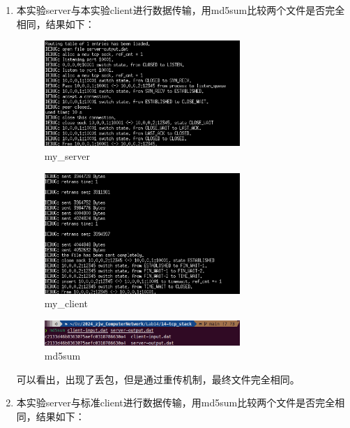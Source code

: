 \documentclass[UTF8]{report}
\begin{document}
\begin{enumerate}
    \item 本实验server与本实验client进行数据传输，用md5sum比较两个文件是否完全相同，结果如下：
    
    \begin{figure}[H]
        \centering
        \includegraphics[width=0.7\textwidth]{my_server_my_client_h1.png}
        \caption{my\_server}
    \end{figure}

    \begin{figure}[H]
        \centering
        \includegraphics[width=0.7\textwidth]{my_server_my_client_h2.png}
        \caption{my\_client}
    \end{figure}

    \begin{figure}[H]
        \centering
        \includegraphics[width=0.7\textwidth]{my_server_my_client_md5sum.png}
        \caption{md5sum}
    \end{figure}

    可以看出，出现了丢包，但是通过重传机制，最终文件完全相同。

    \item 本实验server与标准client进行数据传输，用md5sum比较两个文件是否完全相同，结果如下：
    

\end{enumerate}
\end{document}
